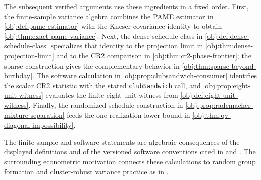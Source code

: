 The subsequent verified arguments use these ingredients in a fixed order. First, the finite-sample variance algebra combines the PAME estimator in \cref{obj:def:pame-estimator} with the Kneser covariance identity to obtain \cref{obj:thm:exact-pame-variance}. Next, the dense schedule class in \cref{obj:def:dense-schedule-class} specializes that identity to the projection limit in \cref{obj:thm:dense-projection-limit} and to the CR2 comparison in \cref{obj:thm:cr2-phase-frontier}; the sparse construction gives the complementary behavior in \cref{obj:thm:sparse-beyond-birthday}. The software calculation in \cref{obj:prop:clubsandwich-consumer} identifies the scalar CR2 statistic with the stated \texttt{clubSandwich} call, and \cref{obj:prop:eight-unit-witness} evaluates the finite eight-unit witness from \cref{obj:def:eight-unit-witness}. Finally, the randomized schedule construction in \cref{obj:prop:rademacher-mixture-separation} feeds the one-realization lower bound in \cref{obj:thm:qv-diagonal-impossibility}.

The finite-sample and software statements are algebraic consequences of the displayed definitions and of the versioned software conventions cited in \citet{ClubSandwich2026} and \citet{Sandwich2026}. The surrounding econometric motivation connects these calculations to random group formation and cluster-robust variance practice as in \citet{FuSamiiWang2026}.

